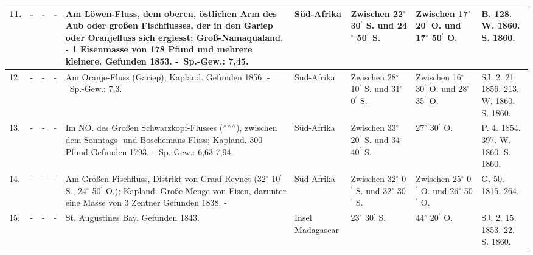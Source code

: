 \documentclass[a4paper, 8pt, oneside, polutonikogreek, german]{article}
\begin{document}
\begin{table}[!ht]
\begin{tabular}{|l|l|l|l|l|l|l|l|l|}
        11. & - & - & - & Am Löwen-Fluss, dem oberen, östlichen Arm des Aub oder großen Fischflusses, der in den Gariep oder Oranjefluss sich ergiesst; Groß-Namaqualand. - 1 Eisenmasse von 178 Pfund und mehrere kleinere. Gefunden 1853. - Sp.-Gew.: 7,45. & Süd-Afrika & Zwischen 22$^\circ$ 30$^\prime$ S. und 24$^\circ$ 50$^\prime$ S. & Zwischen 17$^\circ$ 20$^\prime$ O. und 17$^\circ$ 50$^\prime$ O. & B. 128. W. 1860. S. 1860. \\ \hline
        12. & - & - & - & Am Oranje-Fluss (Gariep); Kapland. Gefunden 1856. - Sp.-Gew.: 7,3. & Süd-Afrika & Zwischen 28$^\circ$ 10$^\prime$ S. und 31$^\circ$ 0$^\prime$ S. & Zwischen 16$^\circ$ 30$^\prime$ O. und 28$^\circ$ 35$^\prime$ O. & SJ. 2. 21. 1856. 213. W. 1860. S. 1860. \\ \hline
        13. & - & - & - & Im NO. des Großen Schwarzkopf-Flusses ($^\wedge$$^\wedge$$^\wedge$), zwischen dem Sonntags- und Boschemans-Fluss; Kapland. 300 Pfund Gefunden 1793. - Sp.-Gew.: 6,63-7,94. & Süd-Afrika & Zwischen 33$^\circ$ 20$^\prime$ S. und 34$^\circ$ 40$^\prime$ S. & 27$^\circ$ 30$^\prime$ O. & P. 4. 1854. 397. W. 1860. S. 1860. \\ \hline
        14. & - & - & - & Am Großen Fischfluss, Distrikt von Graaf-Reynet (32$^\circ$ 10$^\prime$ S., 24$^\circ$ 50$^\prime$ O.); Kapland. Große Menge von Eisen, darunter eine Masse von 3 Zentner Gefunden 1838. - & Süd-Afrika & Zwischen 32$^\circ$ 0$^\prime$ S. und 32$^\circ$ 30$^\prime$ S. & Zwischen 25$^\circ$ 0$^\prime$ O. und 26$^\circ$ 50$^\prime$ O. & G. 50. 1815. 264. \\ \hline
        15. & - & - & - & St. Augustines Bay. Gefunden 1843. & Insel Madagascar & 23$^\circ$ 30$^\prime$ S. & 44$^\circ$ 20$^\prime$ O. & SJ. 2. 15. 1853. 22. S. 1860. \\ \hline
    \end{tabular}
\end{table}
\clearpage
\end{document}

